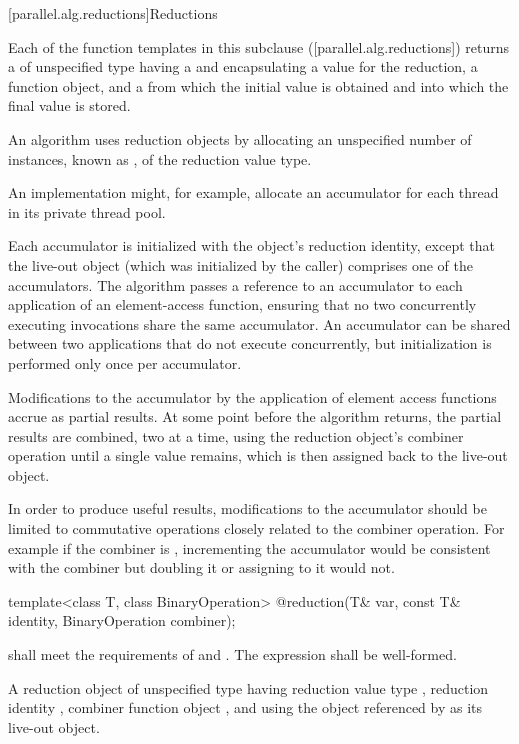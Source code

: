 [parallel.alg.reductions]{Reductions}

\pnum
Each of the function templates in this subclause
([parallel.alg.reductions]) returns a  of unspecified type
having a  and encapsulating a  value for
the reduction, a  function object, and a  from which the
initial value is obtained and into which the final value is stored.

\pnum
An algorithm uses reduction objects by allocating an unspecified number
of instances, known as , of the reduction value type. \begin{note}An
implementation might, for example, allocate an accumulator for each thread in
its private thread pool.\end{note} Each accumulator is initialized with the
object's reduction identity, except that the live-out object (which was
    initialized by the caller) comprises one of the accumulators. The algorithm
passes a reference to an accumulator to each application of an element-access
function, ensuring that no two concurrently executing invocations share the
same accumulator. An accumulator can be shared between two applications that do
not execute concurrently, but initialization is performed only once per
accumulator.

\pnum
Modifications to the accumulator by the application of element access
functions accrue as partial results. At some point before the algorithm
returns, the partial results are combined, two at a time, using the reduction
object's combiner operation until a single value remains, which is then
assigned back to the live-out object. \begin{note}In order to produce useful
results, modifications to the accumulator should be limited to commutative
operations closely related to the combiner operation. For example if the
combiner is , incrementing the accumulator would be consistent with the
combiner but doubling it or assigning to it would not.\end{note}

\begin{itemdecl}
template<class T, class BinaryOperation>
  @\unspec@ reduction(T& var, const T& identity, BinaryOperation combiner);
\end{itemdecl}

\begin{itemdescr}
  \pnum
  \requires {} shall meet the requirements of  and . The expression  shall be well-formed.

  \pnum
  \returns A reduction object of unspecified type having reduction value type , reduction identity , combiner function object , and using the object referenced by  as its live-out object.
\end{itemdescr}

